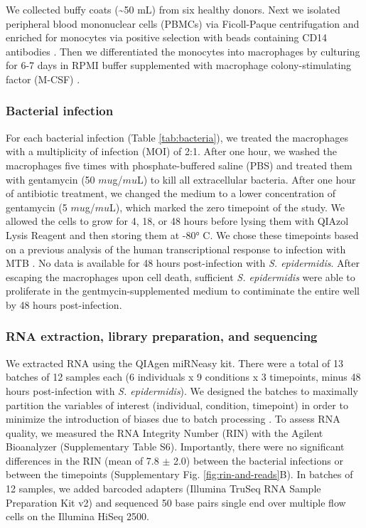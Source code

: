 We collected buffy coats (\textasciitilde{}50 mL) from six healthy
donors. Next we isolated peripheral blood mononuclear cells (PBMCs) via
Ficoll-Paque centrifugation \citep{Rivero-Lezcano2012} and enriched for
monocytes via positive selection with beads containing CD14 antibodies
\citep{Barreiro2012}. Then we differentiated the monocytes into
macrophages by culturing for 6-7 days in RPMI buffer supplemented with
macrophage colony-stimulating factor (M-CSF) \citep{Tailleux2003}.

\subsubsection{Bacterial infection}\label{bacterial-infection}

For each bacterial infection (Table \ref{tab:bacteria}), we treated the macrophages with
a multiplicity of infection (MOI) of 2:1. After one hour, we washed the
macrophages five times with phosphate-buffered saline (PBS) and treated
them with gentamycin (50 $mu$g/$mu$L) to kill all extracellular bacteria.
After one hour of antibiotic treatment, we changed the medium to a lower
concentration of gentamycin (5 $mu$g/$mu$L), which marked the zero timepoint
of the study. We allowed the cells to grow for 4, 18, or 48 hours before
lysing them with QIAzol Lysis Reagent and then storing them at -80° C.
We chose these timepoints based on a previous analysis of the human
transcriptional response to infection with MTB \citep{Tailleux2008}. No
data is available for 48 hours post-infection with \emph{S.
epidermidis}. After escaping the macrophages upon cell death, sufficient
\emph{S. epidermidis} were able to proliferate in the
gentmycin-supplemented medium to contiminate the entire well by 48 hours
post-infection.

\subsubsection{RNA extraction, library preparation, and
sequencing}\label{rna-extraction-library-preparation-and-sequencing}

We extracted RNA using the QIAgen miRNeasy kit. There were a total of 13
batches of 12 samples each (6 individuals x 9 conditions x 3 timepoints,
minus 48 hours post-infection with \emph{S. epidermidis}). We designed
the batches to maximally partition the variables of interest
(individual, condition, timepoint) in order to minimize the introduction
of biases due to batch processing \citep{Auer2010}. To assess RNA
quality, we measured the RNA Integrity Number (RIN) with the Agilent
Bioanalyzer (Supplementary Table S6). Importantly, there were no
significant differences in the RIN (mean of 7.8 $\pm$ 2.0) between the
bacterial infections or between the timepoints (Supplementary Fig. \ref{fig:rin-and-reads}B). In batches of 12 samples, we added barcoded adapters (Illumina
TruSeq RNA Sample Preparation Kit v2) and sequenced 50 base pairs single
end over multiple flow cells on the Illumina HiSeq 2500.

